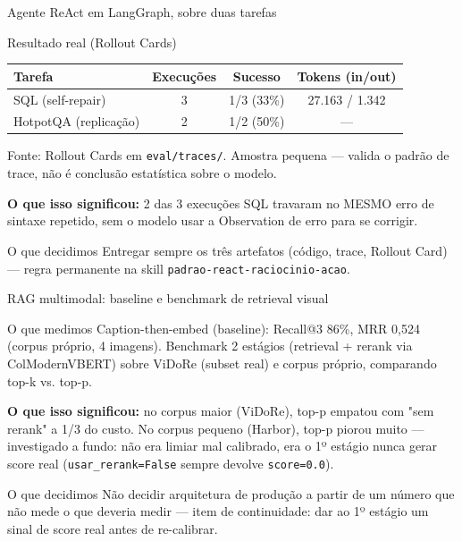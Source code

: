 \documentclass{beamer}
\newenvironment{numerobloco}[1]{\begin{block}{#1}}{\end{block}}
\newenvironment{decisaobloco}[1]{\begin{alertblock}{#1}}{\end{alertblock}}
\begin{document}
\begin{frame}{Agente ReAct em LangGraph, sobre duas tarefas}
  \small
  \begin{numerobloco}{Resultado real (Rollout Cards)}
    \begin{center}
    \begin{tabular}{lccc}
      \toprule
      \textbf{Tarefa} & \textbf{Execuções} & \textbf{Sucesso} & \textbf{Tokens (in/out)} \\
      \midrule
      SQL (self-repair)     & 3 & 1/3 (33\%) & 27.163 / 1.342 \\
      HotpotQA (replicação) & 2 & 1/2 (50\%) & — \\
      \bottomrule
    \end{tabular}
    \end{center}
    \footnotesize Fonte: Rollout Cards em \texttt{eval/traces/}. Amostra pequena —
    valida o padrão de trace, não é conclusão estatística sobre o modelo.
  \end{numerobloco}

  \pause
  \textbf{O que isso significou:} 2 das 3 execuções SQL travaram no MESMO erro de
  sintaxe repetido, sem o modelo usar a Observation de erro para se corrigir.

  \pause
  \begin{decisaobloco}{O que decidimos}
    Entregar sempre os três artefatos (código, trace, Rollout Card) — regra permanente
    na skill \texttt{padrao-react-raciocinio-acao}.
  \end{decisaobloco}
\end{frame}

\begin{frame}{RAG multimodal: baseline e benchmark de retrieval visual}
  \small
  \begin{numerobloco}{O que medimos}
    Caption-then-embed (baseline): Recall@3 86\%, MRR 0,524 (corpus próprio, 4 imagens).
    Benchmark 2 estágios (retrieval + rerank via ColModernVBERT) sobre ViDoRe (subset
    real) e corpus próprio, comparando top-k vs. top-p.
  \end{numerobloco}

  \pause
  \textbf{O que isso significou:} no corpus maior (ViDoRe), top-p empatou com "sem
  rerank" a 1/3 do custo. No corpus pequeno (Harbor), top-p piorou muito — investigado
  a fundo: não era limiar mal calibrado, era o 1º estágio nunca gerar score real
  (\texttt{usar\_rerank=False} sempre devolve \texttt{score=0.0}).

  \pause
  \begin{decisaobloco}{O que decidimos}
    Não decidir arquitetura de produção a partir de um número que não mede o que deveria
    medir — item de continuidade: dar ao 1º estágio um sinal de score real antes de
    re-calibrar.
  \end{decisaobloco}
\end{frame}
\end{document}
